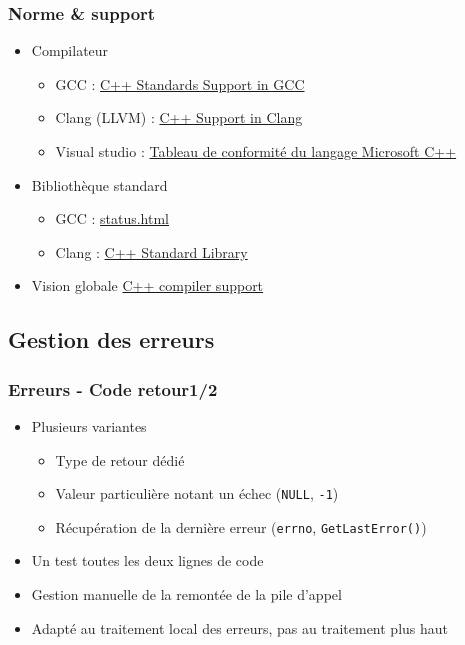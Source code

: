 \documentclass[C++.tex]{subfiles}
\begin{document}
\begin{frame}
	\frametitle{Norme \& support}
	\begin{itemize}
		\item Compilateur
		\begin{itemize}
			\item GCC : \href{https://gcc.gnu.org/projects/cxx-status.html}{C++ Standards Support in GCC}
			\item Clang (LLVM) : \href{http://clang.llvm.org/cxx_status.html}{C++ Support in Clang}
			\item Visual studio : \href{https://docs.microsoft.com/fr-fr/cpp/overview/visual-cpp-language-conformance?view=msvc-160}{Tableau de conformité du langage Microsoft C++}
		\end{itemize}
		\item Bibliothèque standard
		\begin{itemize}
			\item GCC : \href{https://gcc.gnu.org/onlinedocs/libstdc++/manual/status.html}{status.html}
			\item Clang : \href{https://libcxx.llvm.org/}{C++ Standard Library}
		\end{itemize}
		\item Vision globale \href{http://en.cppreference.com/w/cpp/compiler_support}{C++ compiler support}
	\end{itemize}
\end{frame}

\subsection*{Gestion des erreurs}
\begin{frame}
	\frametitle{Erreurs - Code retour\titlehfill{}1/2}
	\begin{itemize}
		\item Plusieurs variantes
		\begin{itemize}
			\item Type de retour dédié
			\item Valeur particulière notant un échec (\lstinline|NULL|, \lstinline|-1|)
			\item Récupération de la dernière erreur (\lstinline|errno|, \lstinline|GetLastError()|)
		\end{itemize}
		\item \og Un test toutes les deux lignes de code\fg{}
		\item Gestion \og manuelle\fg{} de la remontée de la pile d'appel
		\item Adapté au traitement local des erreurs, pas au traitement \og plus haut\fg{}
	\end{itemize}
\end{frame}
\end{document}
